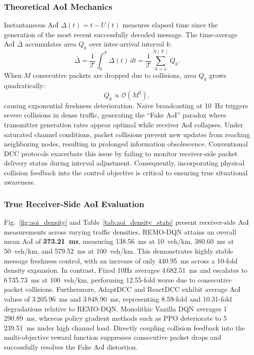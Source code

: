\documentclass[journal]{IEEEtran}
\begin{document}
\subsubsection{Theoretical AoI Mechanics}
Instantaneous AoI $\Delta(t) = t - U(t)$ measures elapsed time since the generation of the most recent successfully decoded message. The time-average AoI $\bar{\Delta}$ accumulates area $Q_k$ over inter-arrival interval $k$:
\begin{equation}
\label{eq:aoi_time_avg}
\bar{\Delta} = \frac{1}{\mathcal{T}} \int_0^{\mathcal{T}} \Delta(t) \, dt = \frac{1}{\mathcal{T}} \sum_{k=1}^{N(\mathcal{T})} Q_k.
\end{equation}
When $M$ consecutive packets are dropped due to collisions, area $Q_k$ grows quadratically:
\begin{equation}
\label{eq:aoi_quad_penalty}
Q_k \propto \mathcal{O}(M^2),
\end{equation}
causing exponential freshness deterioration. Naive broadcasting at 10~Hz triggers severe collisions in dense traffic, generating the ``Fake AoI'' paradox where transmitter generation rates appear optimal while receiver AoI collapses. Under saturated channel conditions, packet collisions prevent new updates from reaching neighboring nodes, resulting in prolonged information obsolescence. Conventional DCC protocols exacerbate this issue by failing to monitor receiver-side packet delivery status during interval adjustment. Consequently, incorporating physical collision feedback into the control objective is critical to ensuring true situational awareness.

\subsubsection{True Receiver-Side AoI Evaluation}
Fig.~\ref{fig:aoi_density} and Table~\ref{tab:aoi_density_stats} present receiver-side AoI measurements across varying traffic densities. REMO-DQN attains an overall mean AoI of \textbf{373.21~ms}, measuring 138.56~ms at 10~veh/km, 380.60~ms at 50~veh/km, and 579.52~ms at 100~veh/km. This demonstrates highly stable message freshness control, with an increase of only 440.95~ms across a 10-fold density expansion. In contrast, Fixed 10Hz averages 4\,682.51~ms and escalates to 6\,735.73~ms at 100~veh/km, performing 12.55-fold worse due to consecutive packet collisions. Furthermore, AdaptDCC and ReactDCC exhibit average AoI values of 3\,205.96~ms and 3\,848.90~ms, representing 8.59-fold and 10.31-fold degradations relative to REMO-DQN. Monolithic Vanilla DQN averages 1\,290.89~ms, whereas policy gradient methods such as PPO deteriorate to 5\,239.51~ms under high channel load. Directly coupling collision feedback into the multi-objective reward function suppresses consecutive packet drops and successfully resolves the Fake AoI distortion.
\end{document}
